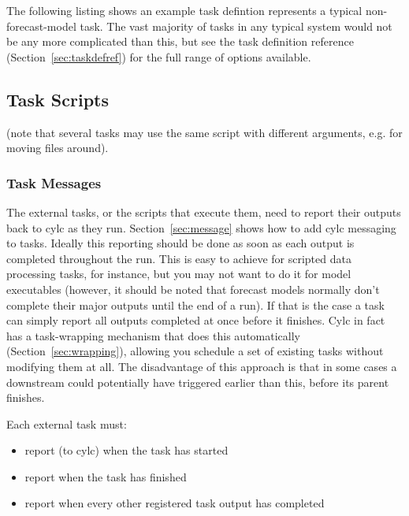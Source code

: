 \documentclass[11pt,a4paper]{article}
\begin{document}
The following listing shows an example task defintion represents a
typical non-forecast-model task. The vast majority of tasks in any
typical system would not be any more complicated than this, but see the
task definition reference (Section~\ref{sec:taskdefref}) for the full
range of options available.

\lstset{language=cylctaskdef}

{

}

\pagebreak
\subsection{Task Scripts}

(note that several tasks may use the same script with different
arguments, e.g. for moving files around).

\subsubsection{Task Messages}

The external tasks, or the scripts that execute them, need to report
their outputs back to cylc as they run. Section~\ref{sec:message} shows
how to add cylc messaging to tasks.  Ideally this reporting should be
done as soon as each output is completed throughout the run. This is
easy to achieve for scripted data processing tasks, for instance, but
you may not want to do it for model executables (however, it should be
noted that forecast models normally don't complete their major outputs
until the end of a run). If that is the case a task can simply report
all outputs completed at once before it finishes.  Cylc in fact has a
task-wrapping mechanism that does this automatically
(Section~\ref{sec:wrapping}), allowing you schedule a set of existing
tasks without modifying them at all. The disadvantage of this approach
is that in some cases a downstream could potentially have triggered
earlier than this, before its parent finishes. 

Each external task must:

\begin{itemize}
\item report (to cylc) when the task has started
\item report when the task has finished
\item report when every other registered task output has
completed
\end{itemize}
\end{document}

